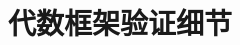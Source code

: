 \documentclass[12pt,a4paper]{article}
\begin{document}
\newpage



\newpage

\appendix

\section{代数框架验证细节}
\label{app:algebraic_validation}
\end{document}
